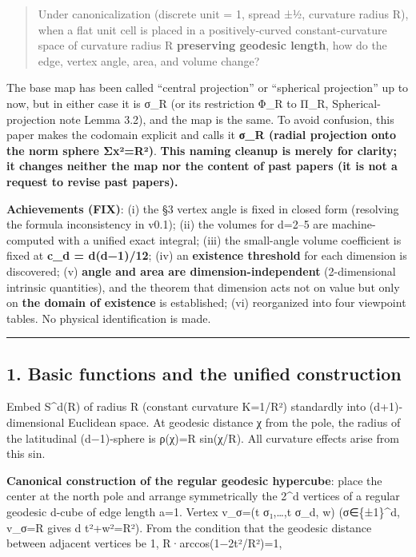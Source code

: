 \documentclass[
]{ltjsarticle}
\begin{document}
\begin{quote}
Under canonicalization (discrete unit = 1, spread ±½, curvature radius
R), when a flat unit cell is placed in a positively-curved
constant-curvature space of curvature radius R \textbf{preserving
geodesic length}, how do the edge, vertex angle, area, and volume
change?
\end{quote}

The base map has been called ``central projection'' or ``spherical
projection'' up to now, but in either case it is σ\_R (or its
restriction Φ\_R to Π\_R, Spherical-projection note Lemma 3.2), and the
map is the same. To avoid confusion, this paper makes the codomain
explicit and calls it \textbf{σ\_R (radial projection onto the norm
sphere Σx²=R²)}. \textbf{This naming cleanup is merely for clarity; it
changes neither the map nor the content of past papers (it is not a
request to revise past papers).}

\textbf{Achievements (FIX)}: (i) the §3 vertex angle is fixed in closed
form (resolving the formula inconsistency in v0.1); (ii) the volumes for
d=2--5 are machine-computed with a unified exact integral; (iii) the
small-angle volume coefficient is fixed at \textbf{c\_d = d(d−1)/12};
(iv) an \textbf{existence threshold} for each dimension is discovered;
(v) \textbf{angle and area are dimension-independent} (2-dimensional
intrinsic quantities), and the theorem that dimension acts not on value
but only on \textbf{the domain of existence} is established; (vi)
reorganized into four viewpoint tables. No physical identification is
made.

\begin{center}\rule{0.5\linewidth}{0.5pt}\end{center}

\subsection{1. Basic functions and the unified
construction}\label{basic-functions-and-the-unified-construction}

Embed S\^{}d(R) of radius R (constant curvature K=1/R²) standardly into
(d+1)-dimensional Euclidean space. At geodesic distance χ from the pole,
the radius of the latitudinal (d−1)-sphere is ρ(χ)=R sin(χ/R). All
curvature effects arise from this sin.

\textbf{Canonical construction of the regular geodesic hypercube}: place
the center at the north pole and arrange symmetrically the 2\^{}d
vertices of a regular geodesic d-cube of edge length a=1. Vertex v\_σ=(t
σ₁,\ldots,t σ\_d, w) (σ∈\{±1\}\^{}d, \textbar v\_σ\textbar=R gives d
t²+w²=R²). From the condition that the geodesic distance between
adjacent vertices be 1, R·arccos(1−2t²/R²)=1,
\end{document}
